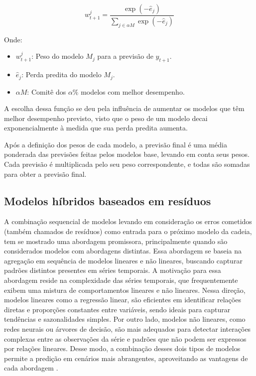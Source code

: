 \begin{equation}
w_{t+1}^j = \frac{\exp(-\hat{e}_j)}{\sum_{j \in \alpha M} \exp(-\hat{e}_j)} \label{softmax_ade}
\end{equation}

Onde:

\begin{itemize}
    \item \( w_{t+1}^j \): Peso do modelo \( M_j \) para a previsão de \( y_{t+1} \).
    \item \( \hat{e}_j \): Perda predita do modelo \( M_j \).
    \item \( \alpha M \): Comitê dos \( \alpha\% \) modelos com melhor desempenho.
\end{itemize}


A escolha dessa função se deu pela influência de aumentar os modelos que têm melhor desempenho previsto, visto que o peso de um modelo decai exponencialmente à medida que sua perda predita aumenta.

Após a definição dos pesos de cada modelo, a previsão final é uma média ponderada das previsões feitas pelos modelos base, levando em conta seus pesos. Cada previsão é multiplicada pelo seu peso correspondente, e todas são somadas para obter a previsão final.


\subsection{Modelos híbridos baseados em resíduos}

A combinação sequencial de modelos levando em consideração os erros cometidos (também chamados de resíduos) como entrada para o próximo modelo da cadeia, tem se mostrado uma abordagem promissora, principalmente quando são considerados modelos com abordagens distintas. Essa abordagem se baseia na agregação em sequência de modelos lineares e não lineares, buscando capturar padrões distintos presentes em séries temporais. A motivação para essa abordagem reside na complexidade das séries temporais, que frequentemente exibem uma mistura de comportamentos lineares e não lineares. Nessa direção, modelos lineares como a regressão linear, são eficientes em identificar relações diretas e proporções constantes entre variáveis, sendo ideais para capturar tendências e sazonalidades simples. Por outro lado, modelos não lineares, como redes neurais ou árvores de decisão, são mais adequados para detectar interações complexas entre as observações da série e padrões que não podem ser expressos por relações lineares. Desse modo, a combinação desses dois tipos de modelos permite a predição em cenários mais abrangentes, aproveitando as vantagens de cada abordagem \citep{zhang2003}.

